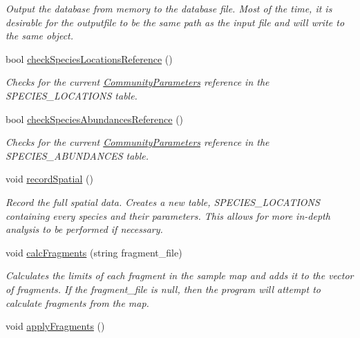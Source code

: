 \begin{DoxyCompactItemize}
\begin{DoxyCompactList}\small\item\em Output the database from memory to the database file. Most of the time, it is desirable for the outputfile to be the same path as the input file and will write to the same object. \end{DoxyCompactList}\item 
bool \hyperlink{class_community_a23b9398df3a63c75d01e3ed3982432c2}{check\+Species\+Locations\+Reference} ()
\begin{DoxyCompactList}\small\item\em Checks for the current \hyperlink{struct_community_parameters}{Community\+Parameters} reference in the S\+P\+E\+C\+I\+E\+S\+\_\+\+L\+O\+C\+A\+T\+I\+O\+NS table. \end{DoxyCompactList}\item 
bool \hyperlink{class_community_a5b2236c98b613c0ec96998bd932101f5}{check\+Species\+Abundances\+Reference} ()
\begin{DoxyCompactList}\small\item\em Checks for the current \hyperlink{struct_community_parameters}{Community\+Parameters} reference in the S\+P\+E\+C\+I\+E\+S\+\_\+\+A\+B\+U\+N\+D\+A\+N\+C\+ES table. \end{DoxyCompactList}\item 
void \hyperlink{class_community_a08be240fddc6ea481014567276a84dd0}{record\+Spatial} ()\hypertarget{class_community_a08be240fddc6ea481014567276a84dd0}{}\label{class_community_a08be240fddc6ea481014567276a84dd0}

\begin{DoxyCompactList}\small\item\em Record the full spatial data. Creates a new table, S\+P\+E\+C\+I\+E\+S\+\_\+\+L\+O\+C\+A\+T\+I\+O\+NS containing every species and their parameters. This allows for more in-\/depth analysis to be performed if necessary. \end{DoxyCompactList}\item 
void \hyperlink{class_community_ac9433a0c34911ec1128b5459f61488fc}{calc\+Fragments} (string fragment\+\_\+file)
\begin{DoxyCompactList}\small\item\em Calculates the limits of each fragment in the sample map and adds it to the vector of fragments. If the fragment\+\_\+file is null, then the program will attempt to calculate fragments from the map. \end{DoxyCompactList}\item 
void \hyperlink{class_community_a706aba5b07c98849cb2b4b0318488f99}{apply\+Fragments} ()\hypertarget{class_community_a706aba5b07c98849cb2b4b0318488f99}{}\label{class_community_a706aba5b07c98849cb2b4b0318488f99}


\end{DoxyCompactItemize}
